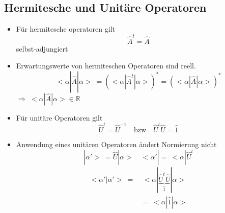 \documentclass[10pt,article,colorback,accentcolor=tud9d]{scrartcl}
\begin{document}
\begin{fleqn}
\subsection{Hermitesche und Unitäre Operatoren}
\begin{itemize}
  \item Für hermitesche operatoren gilt
    \begin{equation}
    \hat{A}^t=\hat{A}
    \end{equation}
    selbst-adjungiert
  \item Erwartungswerte von hermiteschen Operatoren sind reell.
    \begin{equation}
    <\alpha\left.\right|\hat{A}\left.\right|\alpha> \ =  \left(<\alpha \left.\right| \hat{A}^t \left.\right| \alpha >\right)^* = \left(<\alpha \left.\right|\hat{A}\left.\right|\alpha>\right)^*
    \end{equation}
    $\Rightarrow$ $<\alpha\left.\right|\hat{A}\left.\right|\alpha> \in \mathbb{R}$
  \item Für unitäre Operatoren gilt
    \begin{equation}
    \hat{U}^t=\hat{U}^{-1} \quad \text{bzw} \quad \hat{U}^t\hat{U}=\hat{1}
    \end{equation}
  \item Anwendung eines unitären Operatoren ändert Normierung nicht
    \begin{equation} \nonumber
     \left.\right|\alpha'> \ = \hat{U}\left.\right|\alpha> \quad <\alpha'\left.\right|= \ <\alpha\left.\right|\hat{U}^t
    \end{equation}
    \begin{equation}
    \begin{aligned}
    <\alpha'\left.\right|\alpha'> \ =& \ <\alpha\left.\right|\underbrace{\hat{U}^t\hat{U}}_{\hat{1}}\left.\right|\alpha>\\
    &= \ <\alpha\left.\right|\hat{1}\left.\right|\alpha>
    \end{aligned}
    \end{equation}
    \end{itemize}

\end{fleqn}
\end{document}
